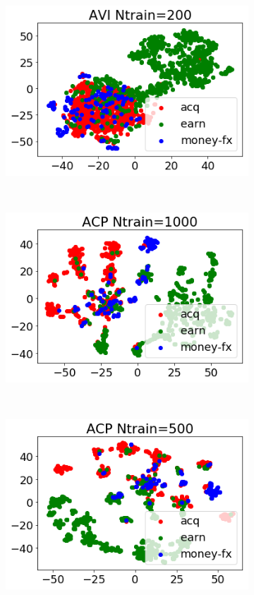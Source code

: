 \documentclass[twoside]{article}
\begin{document}
\begin{figure}
\begin{subfigure}[t]{0.33\textwidth}
        \includegraphics[width=1.0\linewidth]{reuters_avi200.png}
        \label{fig: reuters_h100_avi_200}
    \end{subfigure}
    ~
    \begin{subfigure}[t]{0.33\textwidth}
        \centering
        \includegraphics[width=1.0\linewidth]{reuters_acp1000.png}
        \label{fig: reuters_h100_acp_1000}
    \end{subfigure}%
    ~
    \begin{subfigure}[t]{0.33\textwidth}
        \centering
        \includegraphics[width=1.0\linewidth]{reuters_acp500.png}

\end{subfigure}
\end{figure}
\end{document}
